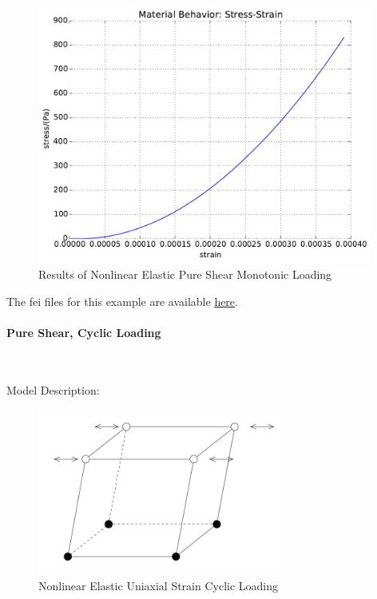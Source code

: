 \documentclass[fleqn,11pt]{article}
\begin{document}
\begin{figure}[H]
\begin{center}
\includegraphics[width=11cm]{../fei_examples/nonlinear_elastic_solid/1pure_shear_mono_loading/result.pdf}
\caption{
\label{Results_Nonlinear Elastic Pure Shear Monotonic Loadin}
Results of Nonlinear Elastic Pure Shear Monotonic Loading}
\end{center}
\end{figure}

The fei files for this example are available \href{https://github.com/yuan-energy/education_examples/tree/master/fei_examples/nonlinear_elastic_solid/1pure_shear_mono_loading}{here}.

\newpage
\paragraph{Pure Shear, Cyclic Loading} ~

Model Description:

\begin{figure}[H]
\begin{center}
\includegraphics[width=8cm]{../Figure-files/shear_cyclic_brick.JPG}
\caption{
\label{Nonlinear Elastic Uniaxial Strain Cyclic Loadin}
Nonlinear Elastic Uniaxial Strain Cyclic Loading}
\end{center}
\end{figure}
\end{document}
